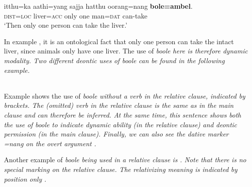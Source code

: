 \ea\label{ex:form:modals:boole:deontic}
\gll  itthu=ka  aathi=yang sajja hatthu oorang=nang \textbf{bole=ambel}. \\
      \textsc{dist}=\textsc{loc} liver=\textsc{acc} only one man=\textsc{dat} can-take \\
    `Then only one person can take the liver.'
\z

In example , it is an ontological fact that only one person can take the intact liver, since animals only have one liver.  The use of \em boole \em here is therefore dynamic modality. Two different deontic  uses of \em boole \em can be found in the following example.


\\

Example  shows the use of \em boole \em without a verb in the relative clause, indicated by brackets. The (omitted) verb in the relative clause is the same as in the main clause  and can therefore be inferred. At the same time, this sentence shows both the use of \em boole \em to indicate dynamic ability (in the relative clause) and deontic permission (in the main clause). Finally, we can also see the dative marker \em =nang \em on the overt argument .

Another example of  \em boole \em being used in a relative clause is . Note that there is no special marking on the relative clause. The relativizing meaning is indicated by position only .


 \\



%
%

